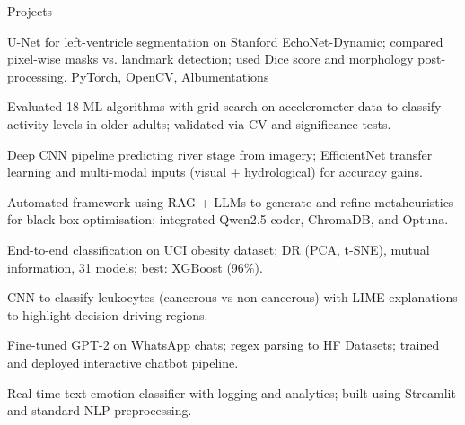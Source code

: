 \begin{rubric}{Projects}
\noentry{~}

U-Net for left-ventricle segmentation on Stanford EchoNet-Dynamic; compared pixel-wise masks vs. landmark detection; used Dice score and morphology post-processing.\hfill {} PyTorch, OpenCV, Albumentations\hfill \href{https://github.com/Tec-AI-23/EchoNetDynamic}{\faGithub}

Evaluated 18 ML algorithms with grid search on accelerometer data to classify activity levels in older adults; validated via CV and significance tests.\hfill \href{https://github.com/Tec-AI-23/HAR70}{\faGithub}

Deep CNN pipeline predicting river stage from imagery; EfficientNet transfer learning and multi-modal inputs (visual + hydrological) for accuracy gains.\hfill \href{https://github.com/musel25/research_deep_learning}{\faGithub}

Automated framework using RAG + LLMs to generate and refine metaheuristics for black-box optimisation; integrated Qwen2.5-coder, ChromaDB, and Optuna.\hfill \href{https://github.com/musel25/llm-metaheuristics}{\faGithub}

End-to-end classification on UCI obesity dataset; DR (PCA, t-SNE), mutual information, 31 models; best: XGBoost (96\%).\hfill \href{https://github.com/musel25/obesity_ml}{\faGithub}

CNN to classify leukocytes (cancerous vs non-cancerous) with LIME explanations to highlight decision-driving regions.

Fine-tuned GPT-2 on WhatsApp chats; regex parsing to HF Datasets; trained and deployed interactive chatbot pipeline.\hfill \href{https://github.com/musel25/her_if_it_was_2025}{\faGithub}

Real-time text emotion classifier with logging and analytics; built using Streamlit and standard NLP preprocessing.\hfill \href{https://github.com/musel25/nlp_project}{\faGithub}

\end{rubric}
